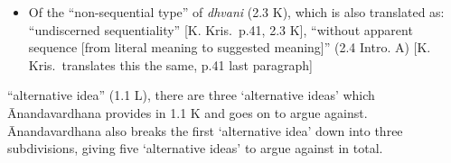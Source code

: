 \documentclass[10pt]{article}
\begin{document}
\begin{multicols}{2}
\begin{enumerate}[
			leftmargin=0em,
			rightmargin=0em,
		]
\begin{enumerate}
\begin{itemize}
				

				\item Of the ``non-sequential type'' of \textit{dhvani} (2.3 K),
				      which is also translated as:
				      ``undiscerned sequentiality'' [K. Kris.\ p.41, 2.3 K],
				      ``without apparent sequence [from literal meaning to suggested meaning]'' (2.4 Intro. A)
				      [K. Kris.\ translates this the same, p.41 last paragraph]
			\end{itemize}

		\end{enumerate}



		 ``alternative idea'' (1.1 L),
		there are three `alternative ideas' which Ānandavardhana provides in 1.1 K and goes on to argue against.
		Ānandavardhana also breaks the first `alternative idea' down into three subdivisions, giving five `alternative ideas' to argue against in total.





\end{enumerate}
\end{multicols}
\end{document}
